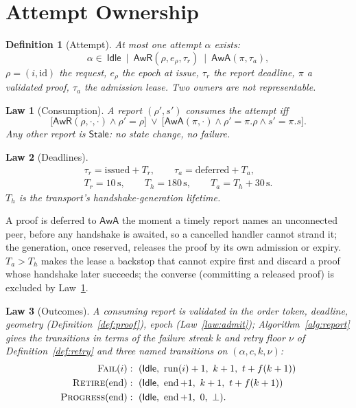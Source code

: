 \documentclass[journal]{IEEEtran}
\newtheorem{definition}{Definition}
\newtheorem{law}{Law}
\newcommand{\run}{\operatorname{run}}
\newcommand{\pend}{\operatorname{end}}
\newcommand{\Idle}{\mathsf{Idle}}
\newcommand{\AwR}{\mathsf{AwR}}
\newcommand{\AwA}{\mathsf{AwA}}
\newcommand{\Stale}{\mathsf{Stale}}
\newcommand{\Fail}{\textsc{Fail}}
\newcommand{\Retire}{\textsc{Retire}}
\newcommand{\Progress}{\textsc{Progress}}
\newcommand{\att}{\alpha}
\begin{document}
\section{Attempt Ownership}\label{sec:attempt}

\begin{definition}[Attempt]\label{def:attempt}
At most one attempt $\att$ exists:
\[
\att\in\ \Idle\ \mid\ \AwR(\rho,e_\rho,\tau_r)\ \mid\ \AwA(\pi,\tau_a),
\]
$\rho=(i,\mathrm{id})$ the request, $e_\rho$ the epoch at issue, $\tau_r$
the report deadline, $\pi$ a validated proof, $\tau_a$ the admission lease.
Two owners are not representable.
\end{definition}

\begin{law}[Consumption]\label{law:consume}
A report $(\rho',s')$ consumes the attempt iff
\[
\bigl[\AwR(\rho,\cdot,\cdot)\wedge\rho'=\rho\bigr]\ \vee\
\bigl[\AwA(\pi,\cdot)\wedge\rho'=\pi.\rho\wedge s'=\pi.s\bigr].
\]
Any other report is $\Stale$: no state change, no failure.
\end{law}

\begin{law}[Deadlines]\label{law:deadlines}
\begin{gather*}
\tau_r=\mathrm{issued}+T_r,\qquad \tau_a=\mathrm{deferred}+T_a,\\
T_r=10\,\mathrm{s},\qquad T_h=180\,\mathrm{s},\qquad T_a=T_h+30\,\mathrm{s}.
\end{gather*}
$T_h$ is the transport's handshake-generation lifetime.
\end{law}

A proof is deferred to $\AwA$ the moment a timely report names an
unconnected peer, before any handshake is awaited, so a cancelled handler
cannot strand it; the generation, once reserved, releases the proof by its
own admission or expiry.  $T_a>T_h$ makes the lease a backstop that cannot
expire first and discard a proof whose handshake later succeeds; the
converse (committing a released proof) is excluded by Law~\ref{law:consume}.

\begin{law}[Outcomes]\label{law:outcomes}
A consuming report is validated in the order token, deadline, geometry
(Definition~\ref{def:proof}), epoch (Law~\ref{law:admit});
Algorithm~\ref{alg:report} gives the transitions in terms of the failure
streak $k$ and retry floor $\nu$ of Definition~\ref{def:retry} and three
named transitions on $(\att,c,k,\nu)$:
\begin{align*}
\Fail(i)&:\ (\Idle,\ \run(i)+1,\ k+1,\ t+f(k+1))\\
\Retire(\pend)&:\ (\Idle,\ \pend+1,\ k+1,\ t+f(k+1))\\
\Progress(\pend)&:\ (\Idle,\ \pend+1,\ 0,\ \bot).
\end{align*}
\end{law}
\end{document}
